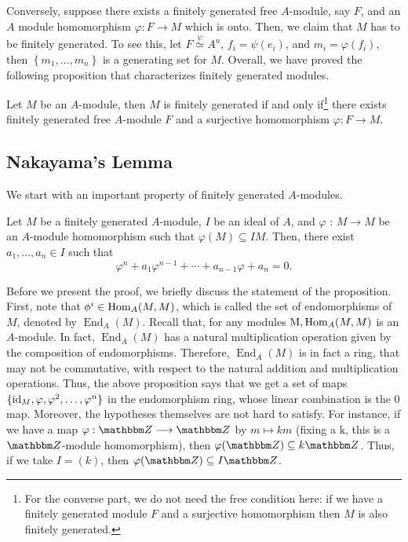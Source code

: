 Conversely, suppose there exists a finitely generated free $A$-module, say $F$, and an $A$ module homomorphism $\varphi: F \longrightarrow M$ which is onto. Then, we claim that 
$M$ has to be finitely generated. To see this, let $F \stackrel{\psi}{\simeq} A^{n}$, $f_{i}=\psi\left(e_{i}\right)$, and $m_{i}=\varphi\left(f_{i}\right)$, then $\left\{m_{1}, \ldots, m_{n}\right\}$ is a generating set for $M$. Overall, we have proved the following proposition that characterizes finitely generated modules.
\begin{proposition}\label{prop: char-fg-modules}
    Let $M$ be an $A$-module, then $M$ is finitely generated if and only if\footnote{For the converse part, we do not need the free condition here: if we have a finitely generated module $F$ and a surjective homomorphism then $M$ is also finitely generated.} there exists finitely generated free $A$-module $F$ and a surjective homomorphism $\varphi: F \longrightarrow M$.
\end{proposition} 

\subsection{Nakayama's Lemma}
We start with an important property of finitely generated $A$-modules. 
\begin{proposition}\label{prop: lin-dep-fg-module}
    Let $M$ be a finitely generated $A$-module, $I$ be an ideal of $A$, and $\varphi$ : $M \longrightarrow M$ be an $A$-module homomorphism such that $\varphi(M) \subseteq I M$. Then, there exist $a_{1}, \ldots, a_{n} \in I$ such that 
    \[
    \varphi^{n}+a_{1} \varphi^{n-1}+\cdots+a_{n-1} \varphi+a_{n}=0.
    \]
\end{proposition} 

Before we present the proof, we briefly discuss the statement of the proposition. First, note that $\phi^i \in {\operatorname{\text{Hom\/}}}_A(M,M)$, which is called the set of endomorphisms of $M$, denoted by $\operatorname{End}_A(M)$. Recall that, for any modules $\mathrm{M}, {\operatorname{\text{Hom\/}}}_{A}(M, M)$ is an $A$-module. In fact, $\operatorname{End}_{A}(M)$ has a natural multiplication operation given by the composition of endomorphisms.
Therefore, $\operatorname{End}_{A}(M)$ is in fact a ring, that may not be commutative, with respect to the natural addition and multiplication operations. Thus, the above proposition says that we get a set of maps $\{\operatorname{\text{id\/}}_M, \varphi, \varphi^{2}, \ldots, \varphi^{n}\}$ in the endomorphism ring, whose linear combination is the 0 map. Moreover, the hypotheses themselves are not hard to satisfy. For instance, if we have a map $\varphi: {\Z} \longrightarrow {\Z}$ by $m \mapsto k m$ (fixing a $\mathrm{k}$, this is a ${\Z}$-module homomorphism), then $\varphi({\Z}) \subseteq k {\Z}$. Thus, if we take $I=(k)$, then $\varphi({\Z}) \subseteq I {\Z}$. 

